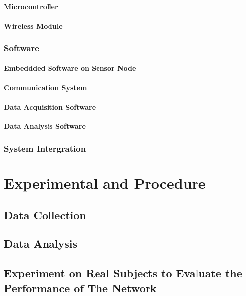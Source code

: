 \documentclass[letterpaper,12pt,titlepage,oneside,final]{book}
\begin{document}
\subsubsection{Microcontroller}

\subsubsection{Wireless Module}

\subsection{Software}

\subsubsection{Embeddded Software on Sensor Node}

\subsubsection{Communication System}

\subsubsection{Data Acquisition Software}

\subsubsection{Data Analysis Software}

\subsection{System Intergration}

\chapter{Experimental and Procedure}

\section{Data Collection}

\section{Data Analysis}

\section{Experiment on Real Subjects to Evaluate the Performance of The Network}
\end{document}
